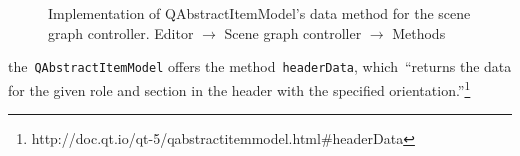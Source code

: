 \documentclass[%
    a4paper,    %
    justified,  %
    nobib,      %
    openany     %
]{tufte-book}
\begin{document}
\begin{figure}
\begin{flushleft}
\begin{minipage}{\linewidth}
\begin{list}{}{\setlength{\itemsep}{-\parsep}\setlength{\itemindent}{-\leftmargin}}
\item{}
\end{list}
\end{minipage}\vspace{4ex}
\end{flushleft}
\caption{Implementation of QAbstractItemModel's data method for the scene
  graph controller.
  \newline{}\newline{}Editor $\rightarrow$ Scene graph controller $\rightarrow$
  Methods}
\label{editor:lst:scene-graph-controller:methods:data}
\end{figure}

the~\verb=QAbstractItemModel= offers the method~\verb=headerData=,
which~\enquote{returns the data for the given role and section in the header
with the specified
orientation.}\footnote{http://doc.qt.io/qt-5/qabstractitemmodel.html\#headerData}
\end{document}
